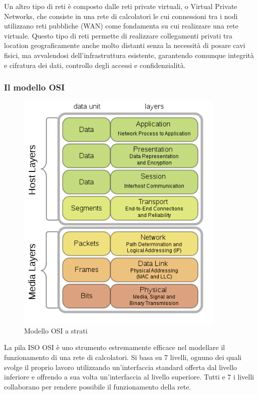 Un altro tipo di reti è composto dalle reti private virtuali, o Virtual Private Networks, che consiste in una rete di calcolatori le cui connessioni tra i nodi utilizzano reti pubbliche (WAN) come fondamenta su cui realizzare una rete virtuale. Questo tipo di reti permette di realizzare collegamenti privati tra location geograficamente anche molto distanti senza la necessità di posare cavi fisici, ma avvalendosi dell'infrastruttura esistente, garantendo comunque integrità e cifratura dei dati, controllo degli accessi e confidenzialità.

\subsubsection{Il modello OSI}
\begin{figure}[ht]
    \centering
    \includegraphics[width=10cm]{figure/osi.png}
    \caption{Modello OSI a strati}
\end{figure}

La pila ISO OSI è uno strumento estremamente efficace nel modellare il funzionamento di una rete di calcolatori.
Si basa su 7 livelli, ognuno dei quali svolge il proprio lavoro utilizzando un'interfaccia standard offerta dal livello inferiore e offrendo a sua volta un'interfaccia al livello superiore.
Tutti e 7 i livelli collaborano per rendere possibile il funzionamento della rete.

